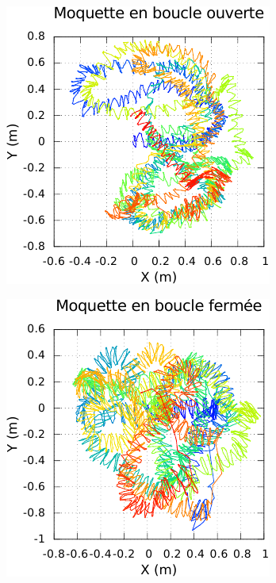 \begin{figure}[htbp]
\begin{subfigure}{0.22\paperwidth}
    \end{subfigure}
    \begin{subfigure}{0.22\paperwidth}
        \centering
        \includegraphics[type=pdf,ext=.pdf,read=.pdf,width=1.0\linewidth]{../plot/OdometryLWPR/carpet_open_learn_log_complete_traj}
    \end{subfigure}
    \begin{subfigure}{0.22\paperwidth}
        \centering
        \includegraphics[type=pdf,ext=.pdf,read=.pdf,width=1.0\linewidth]{../plot/OdometryLWPR/carpet_close_learn_log_complete_traj}

\end{subfigure}
\end{figure}
